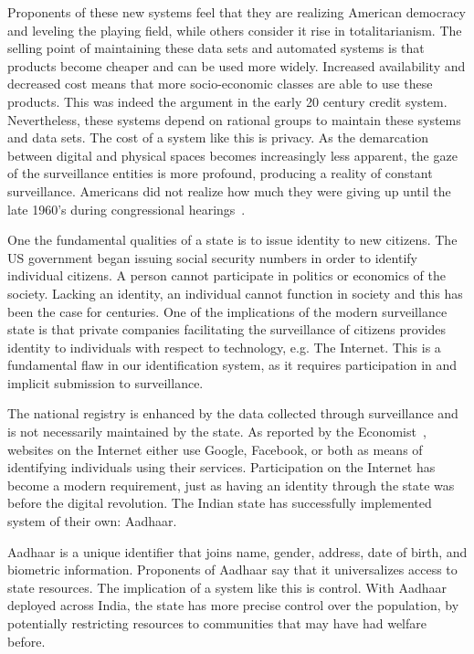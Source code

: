 Proponents of these new systems feel that they are realizing American democracy
and leveling the playing field, while others consider it rise in
totalitarianism. The selling point of maintaining these data sets and
automated systems is that products become cheaper and can be used more widely.
Increased availability and decreased cost means that more socio-economic
classes are able to use these products. This was indeed the argument in the
early 20 century credit system. Nevertheless, these systems depend on
rational groups to maintain these systems and data sets. The cost of a system
like this is privacy. As the demarcation between digital and physical spaces
becomes increasingly less apparent, the gaze of the surveillance entities is
more profound, producing a reality of constant surveillance. Americans did not
realize how much they were giving up until the late 1960's during congressional
hearings~\cite{lauer2017creditworthy}.

One the fundamental qualities of a state is to issue identity to new citizens.
The US government began issuing social security numbers in order to identify
individual citizens. A person cannot participate in politics or economics of
the society. Lacking an identity, an individual cannot function in society and
this has been the case for centuries. One of the implications of the modern
surveillance state is that private companies facilitating the surveillance of
citizens provides identity to individuals with respect to technology, e.g. The
Internet. This is a fundamental flaw in our identification system, as it
requires participation in and implicit submission to surveillance.

The national registry is enhanced by the data collected through surveillance
and is not necessarily maintained by the state. As reported by the
Economist~\cite{identity2018economist}, %
websites on the Internet either use Google, Facebook, or both as means of
identifying individuals using their services. Participation on the Internet has
become a modern requirement, just as having an identity through the state was
before the digital revolution. The Indian state has successfully implemented
system of their own: Aadhaar.

Aadhaar is a unique identifier that joins name, gender, address, date of birth,
and biometric information. Proponents of Aadhaar say that it universalizes
access to state resources. The implication of a system like this is control.
With Aadhaar deployed across India, the state has more precise control over the
population, by potentially restricting resources to communities that may have
had welfare before.

